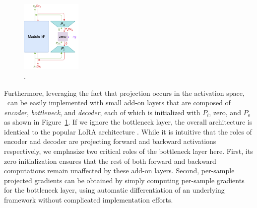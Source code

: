 \begin{figure}
  \begin{center}
  \vskip -18pt
    \includegraphics[width=0.26\textwidth]{figures/logra2.pdf}
  \end{center}
  \vskip -8pt
  \caption{\method.}
  \vskip -10pt
  \label{fig:logra}
\end{figure}

Furthermore, leveraging the fact that projection occurs in the activation space, \method\ can be easily implemented with small add-on layers that are composed of \textit{encoder}, \textit{bottleneck}, and \textit{decoder}, each of which is initialized with $P_i$, zero, and $P_o$ as shown in Figure~\ref{fig:logra}. If we ignore the bottleneck layer, the overall architecture is identical to the popular LoRA architecture \cite{hu2021lora}. While it is intuitive that the roles of encoder and decoder are projecting forward and backward activations respectively, we emphasize two critical roles of the bottleneck layer here. First, its zero initialization ensures that the rest of both forward and backward computations remain unaffected by these add-on layers. Second, per-sample projected gradients can be obtained by simply computing per-sample gradients for the bottleneck layer, using automatic differentiation of an underlying framework without complicated implementation efforts.

